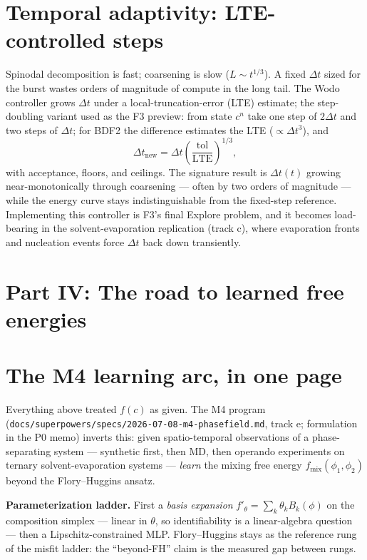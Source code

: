 \documentclass[11pt]{article}
\begin{document}
\section{Temporal adaptivity: LTE-controlled steps}
\label{sec:lte}

Spinodal decomposition is fast; coarsening is slow ($L \sim t^{1/3}$).
A fixed $\Delta t$ sized for the burst wastes orders of magnitude of
compute in the long tail. The Wodo controller \cite{wodo2011} grows
$\Delta t$ under a local-truncation-error (LTE) estimate; the
step-doubling variant used as the F3 preview: from state $c^n$ take
one step of $2\Delta t$ and two steps of $\Delta t$; for BDF2 the
difference estimates the LTE ($\propto \Delta t^3$), and
\begin{equation}
  \Delta t_{\text{new}}
  = \Delta t \left( \frac{\text{tol}}{\text{LTE}} \right)^{1/3},
\end{equation}
with acceptance, floors, and ceilings. The signature result is
$\Delta t(t)$ growing near-monotonically through coarsening --- often
by two orders of magnitude --- while the energy curve stays
indistinguishable from the fixed-step reference. Implementing this
controller is F3's final Explore problem, and it becomes load-bearing
in the solvent-evaporation replication (track c), where evaporation
fronts and nucleation events force $\Delta t$ back down transiently.

\section*{Part IV: The road to learned free energies}

\section{The M4 learning arc, in one page}

Everything above treated $f(c)$ as given. The M4 program
(\texttt{docs/superpowers/specs/2026-07-08-m4-phasefield.md}, track e;
formulation in the P0 memo) inverts this: given spatio-temporal
observations of a phase-separating system --- synthetic first, then MD,
then operando experiments on ternary solvent-evaporation systems
\cite{wodo2012} --- \emph{learn} the mixing free energy
$f_{\text{mix}}(\phi_1,\phi_2)$ beyond the Flory--Huggins ansatz.

\textbf{Parameterization ladder.} First a \emph{basis expansion}
$f'_\theta = \sum_k \theta_k B_k(\phi)$ on the composition simplex ---
linear in $\theta$, so identifiability is a linear-algebra question ---
then a Lipschitz-constrained MLP. Flory--Huggins stays as the reference
rung of the misfit ladder: the ``beyond-FH'' claim is the measured gap
between rungs.
\end{document}
